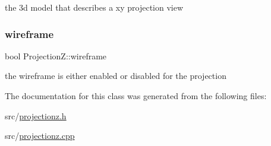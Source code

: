 the 3d model that describes a xy projection view 

\mbox{\label{class_projection_z_a24466982ce2e792bb843426c35782222}} 
\subsubsection{\texorpdfstring{wireframe}{wireframe}}
{\footnotesize\ttfamily bool Projection\+Z\+::wireframe}



the wireframe is either enabled or disabled for the projection 



The documentation for this class was generated from the following files\+:\begin{DoxyCompactItemize}
\item 
src/\mbox{\hyperlink{projectionz_8h}{projectionz.\+h}}\item 
src/\mbox{\hyperlink{projectionz_8cpp}{projectionz.\+cpp}}\end{DoxyCompactItemize}
